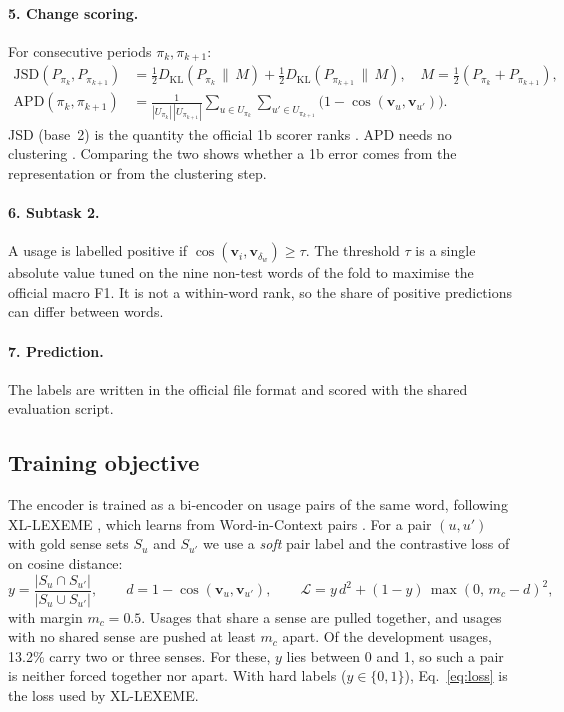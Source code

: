 \paragraph{5. Change scoring.} For consecutive periods $\pi_k,\pi_{k+1}$:
\begin{align}
  \mathrm{JSD}(P_{\pi_k},P_{\pi_{k+1}}) &= \tfrac12 D_{\mathrm{KL}}(P_{\pi_k}\,\|\,M)
     + \tfrac12 D_{\mathrm{KL}}(P_{\pi_{k+1}}\,\|\,M),\quad M=\tfrac12(P_{\pi_k}+P_{\pi_{k+1}}),
     \label{eq:jsd}\\
  \mathrm{APD}(\pi_k,\pi_{k+1}) &= \frac{1}{|U_{\pi_k}|\,|U_{\pi_{k+1}}|}
     \sum_{u\in U_{\pi_k}}\sum_{u'\in U_{\pi_{k+1}}}\bigl(1-\cos(\mathbf v_u,\mathbf v_{u'})\bigr).
     \label{eq:apd}
\end{align}
JSD (base~2) is the quantity the official 1b scorer ranks
\citep{lin1991divergence,giulianelli2020analysing}. APD needs no clustering
\citep{kutuzov2020uio}. Comparing the two shows whether a 1b error comes from the
representation or from the clustering step.

\paragraph{6. Subtask 2.} A usage is labelled positive if
$\cos(\mathbf v_i,\mathbf v_{\delta_w})\ge\tau$. The threshold $\tau$ is a single
absolute value tuned on the nine non-test words of the fold to maximise the
official macro F1. It is not a within-word rank, so the share of positive
predictions can differ between words.

\paragraph{7. Prediction.} The labels are written in the official file format and
scored with the shared evaluation script.

\subsection{Training objective}
\label{sec:approach-training}

The encoder is trained as a bi-encoder on usage pairs of the same word, following
XL-LEXEME \citep{cassotti2023xllexeme}, which learns from Word-in-Context
pairs \citep{pilehvar2019wic}. For a pair $(u,u')$ with gold sense sets $S_u$ and
$S_{u'}$ we use a \emph{soft} pair label and the contrastive loss of
\citet{hadsell2006contrastive} on cosine distance:
\begin{equation}
  y=\frac{|S_u\cap S_{u'}|}{|S_u\cup S_{u'}|},\qquad
  d=1-\cos(\mathbf v_u,\mathbf v_{u'}),\qquad
  \mathcal L = y\,d^{2} + (1-y)\,\max(0,\,m_c-d)^{2},
  \label{eq:loss}
\end{equation}
with margin $m_c=0.5$. Usages that share a sense are pulled together, and usages
with no shared sense are pushed at least $m_c$ apart. Of the development usages,
13.2\% carry two or three senses. For these, $y$ lies between 0 and 1, so such a
pair is neither forced together nor apart. With hard labels ($y\in\{0,1\}$),
Eq.~\eqref{eq:loss} is the loss used by XL-LEXEME.

